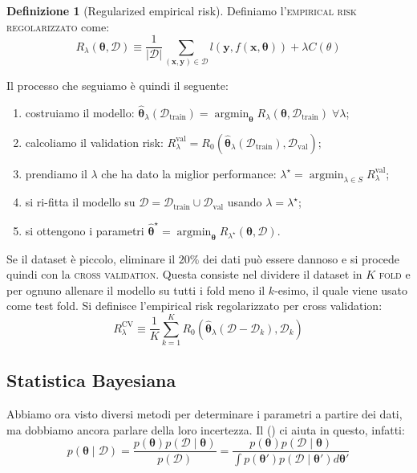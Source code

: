 \documentclass[10pt]{article}
\DeclareMathOperator*{\argmin}{argmin}
\renewcommand{\vec}[1]{\boldsymbol{#1}}
\newcommand{\im}[1]{\textsc{#1}}
\newcommand{\cond}{\mid}
\newcommand{\pare}[1]{
	\ensuremath{\left(#1\right)}
}
\newcommand{\Crefn}[1]{\Cref{#1} (\nameref{#1})}
\theoremstyle{definition}
\newtheorem{definition}{Definizione}[section]
\begin{document}
\begin{definition}[Regularized empirical risk]
Definiamo l'\im{empirical risk regolarizzato} come:
\begin{equation}
R_\lambda\pare{\vec{\theta}, \mathcal{D}} \equiv \frac{1}{\left|\mathcal{D}\right|}\sum_{\pare{\vec{x}, \vec{y}}\in\mathcal{D}} l\pare{\vec{y}, f\pare{\vec{x}, \vec{\theta}}} + \lambda C\pare{\theta}
\end{equation}
\end{definition}
\noindent
Il processo che seguiamo è quindi il seguente:
\begin{enumerate}
\item costruiamo il modello: $\hat{\vec{\theta}}_\lambda\pare{\mathcal{D}_\text{train}} = \argmin_{\vec{\theta}} R_\lambda\pare{\vec{\theta}, \mathcal{D}_{\text{train}}}\;\forall\lambda$;
\item calcoliamo il validation risk: $R_\lambda^\text{val} = R_0\pare{\hat{\vec{\theta}}_\lambda\pare{\mathcal{D}_\text{train}}, \mathcal{D}_\text{val}}$;
\item prendiamo il \(\lambda\) che ha dato la miglior performance: \(\lambda^\star = \argmin_{\lambda\in S} R_\lambda^\text{val}\);
\item si ri-fitta il modello su \(\mathcal{D} = \mathcal{D}_\text{train}\cup\mathcal{D}_\text{val}\) usando \( \lambda=\lambda^\star \);
\item si ottengono i parametri \(\hat{\vec{\theta}}^\star = \argmin_{\vec{\theta}} R_{\lambda^\star}\pare{\vec{\theta}, \mathcal{D}}\).
\end{enumerate}

    Se il dataset è piccolo, eliminare il \( 20\% \) dei dati può essere dannoso e si procede quindi con la \im{cross validation}. Questa consiste nel dividere il dataset in $K$ \im{fold} e per ognuno allenare il modello su tutti i fold meno il \(k\)-esimo, il quale viene usato come test fold. Si definisce l'empirical risk regolarizzato per cross validation:
    \begin{equation}
    R_\lambda^\text{CV} \equiv \frac{1}{K} \sum_{k=1}^K R_0\pare{\hat{\vec{\theta}}_\lambda\pare{\mathcal{D} - \mathcal{D}_k}, \mathcal{D}_k}
    \end{equation}

\subsection{Statistica Bayesiana}
    Abbiamo ora visto diversi metodi per determinare i parametri a partire dei dati, ma dobbiamo
    ancora parlare della loro incertezza. Il \Crefn{teo:bayes} ci aiuta in questo, infatti:
    \begin{equation}
        p\pare{\vec{\theta}\cond \mathcal{D}} = \frac{p\pare{\vec{\theta}} p\pare{\mathcal{D}\cond\vec{\theta}}}{p\pare{\mathcal{D}}} = \frac{p\pare{\vec{\theta}} p\pare{\mathcal{D}\cond\vec{\theta}}}{\int p\pare{\vec{\theta}'}p\pare{\mathcal{D}\cond\vec{\theta}'}d\vec{\theta}'}
    \end{equation}
\end{document}
